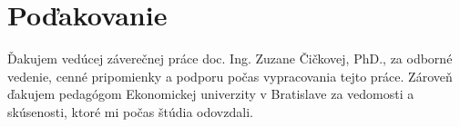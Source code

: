 \chapter*{Poďakovanie}

\noindent
Ďakujem vedúcej záverečnej práce doc. Ing. Zuzane Čičkovej, PhD., za odborné
vedenie, cenné pripomienky a podporu počas vypracovania tejto práce.
Zároveň ďakujem pedagógom Ekonomickej univerzity v Bratislave za vedomosti
a skúsenosti, ktoré mi počas štúdia odovzdali.

\clearpage
